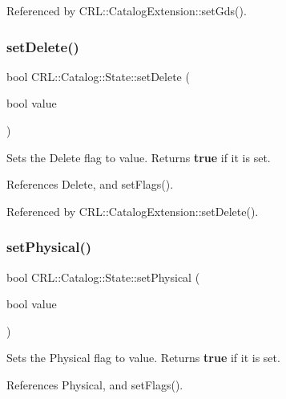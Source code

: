 Referenced by C\+R\+L\+::\+Catalog\+Extension\+::set\+Gds().

\mbox{\label{classCRL_1_1Catalog_1_1State_a53873a1a42083389dfae02b46b3f2de3}} 
\subsubsection{\texorpdfstring{set\+Delete()}{setDelete()}}
{\footnotesize\ttfamily bool C\+R\+L\+::\+Catalog\+::\+State\+::set\+Delete (\begin{DoxyParamCaption}\item[{bool}]{value }\end{DoxyParamCaption})\hspace{0.3cm}{\ttfamily [inline]}}

Sets the Delete flag to {\ttfamily value}. Returns {\bfseries true} if it is set. 

References Delete, and set\+Flags().



Referenced by C\+R\+L\+::\+Catalog\+Extension\+::set\+Delete().

\mbox{\label{classCRL_1_1Catalog_1_1State_a85a091727c8e7de2b16d01088324de0d}} 
\subsubsection{\texorpdfstring{set\+Physical()}{setPhysical()}}
{\footnotesize\ttfamily bool C\+R\+L\+::\+Catalog\+::\+State\+::set\+Physical (\begin{DoxyParamCaption}\item[{bool}]{value }\end{DoxyParamCaption})\hspace{0.3cm}{\ttfamily [inline]}}

Sets the Physical flag to {\ttfamily value}. Returns {\bfseries true} if it is set. 

References Physical, and set\+Flags().




